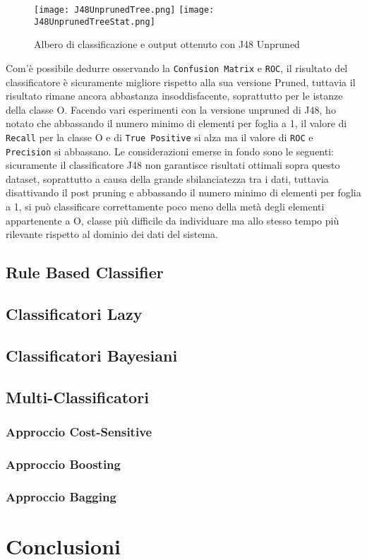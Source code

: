 \begin{figure}[H]
	\texttt{[image: J48UnprunedTree.png]}
	\texttt{[image: J48UnprunedTreeStat.png]}
	\caption{Albero di classificazione e output ottenuto con J48 Unpruned}
\end{figure}
Com'è possibile dedurre osservando la \texttt{Confusion Matrix} e \texttt{ROC}, il risultato del classificatore è sicuramente migliore rispetto alla sua versione Pruned, tuttavia il risultato rimane ancora abbastanza insoddisfacente, soprattutto per le istanze della classe O.
Facendo vari esperimenti con la versione unpruned di J48, ho notato che abbassando il numero minimo di elementi per foglia a 1, il valore di \texttt{Recall} per la classe O e di \texttt{True Positive} si alza ma il valore di \texttt{ROC} e \texttt{Precision} si abbassano.
Le considerazioni emerse in fondo sono le seguenti: sicuramente il classificatore J48 non garantisce risultati ottimali sopra questo dataset, soprattutto a causa della grande sbilanciatezza tra i dati, tuttavia disattivando il post pruning e abbassando il numero minimo di elementi per foglia a 1, si può classificare correttamente poco meno della metà degli elementi appartenente a O, classe più difficile da individuare ma allo stesso tempo più rilevante rispetto al dominio dei dati del sistema.
  
  
 
  
  \subsection{Rule Based Classifier}
  \subsection{Classificatori Lazy}
  \subsection{Classificatori Bayesiani}
  \subsection{Multi-Classificatori}
  \subsubsection{Approccio Cost-Sensitive}
  \subsubsection{Approccio Boosting}
  \subsubsection{Approccio Bagging}
  \section{Conclusioni}
  

